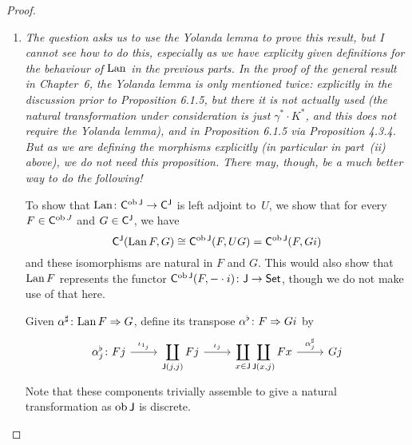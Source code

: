 \documentclass[../../solutions]{subfiles}
\begin{document}
\begin{proof}
\begin{enumerate}[label=(\roman*)]
  \item \emph{The question asks us to use the Yolanda lemma to prove
      this result, but I cannot see how to do this, especially as we
      have explicity given definitions for the behaviour of $\operatorname{Lan}$ in
      the previous parts.  In the proof of the general result in
      Chapter~6, the Yolanda lemma is only mentioned twice: explicitly
      in the discussion prior to Proposition 6.1.5, but there it is
      not actually used (the natural transformation under
      consideration is just $\gamma^*\cdot K^*$, and this does not
      require the Yolanda lemma), and in Proposition 6.1.5 via
      Proposition 4.3.4.  But as we are defining the morphisms
      explicitly (in particular in part~(ii) above), we do not need
      this proposition.  There may, though, be a much better way to do
      the following!}

    \smallskip

    To show that ${\operatorname{Lan}}\colon{{\mathsf{C}}^{\operatorname{ob}{\mathsf{J}}}}\to{{\mathsf{C}}^{\mathsf{J}}}$ is left adjoint
    to~$U$, we show that for every $F\in{\mathsf{C}}^{\operatorname{ob} J}$ and
    $G\in{\mathsf{C}}^{\mathsf{J}}$, we have
    $${\mathsf{C}}^{\mathsf{J}}(\operatorname{Lan} F,G)\cong {\mathsf{C}}^{\operatorname{ob}{\mathsf{J}}}(F,UG)={\mathsf{C}}^{\operatorname{ob}{\mathsf{J}}}(F,Gi)$$
    and these isomorphisms are natural in $F$ and $G$.  This would
    also show that $\operatorname{Lan} F$ represents the functor
    ${{\mathsf{C}}^{\operatorname{ob}{\mathsf{J}}}(F,-\cdot i)}\colon{{\mathsf{J}}}\to{\ensuremath{\mathsf{Set}}}$, though we do not
    make use of that here.

    Given ${\alpha^\sharp}\colon{\operatorname{Lan}F}\Rightarrow{G}$, define its transpose
    ${\alpha^\flat}\colon{F}\Rightarrow{Gi}$ by
    $$
    \begin{tikzcd}
      \alpha^\flat_j\colon Fj \ar[r, "\iota_{1_j}"]
      & \displaystyle \coprod_{\sJ(j,j)} Fj \ar[r, "\iota_j"]
      & \displaystyle \coprod_{x\in\sJ\vphantom{j}}\coprod_{\sJ(x,j)} Fx
      \ar[r, "\alpha^\sharp_j"]
      & Gj
    \end{tikzcd}    
    $$
    Note that these components trivially assemble to give a natural
    transformation as $\operatorname{ob}{\mathsf{J}}$ is discrete.


\end{enumerate}
\end{proof}
\end{document}

